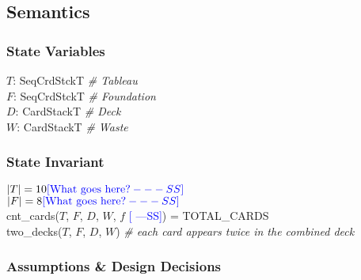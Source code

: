 \documentclass[12pt]{article}
\newcommand{\authornote}[3]{\textcolor{#1}{[#3 ---#2]}}
\newcommand{\authornote}[3]{}
\newcommand{\wss}[1]{\authornote{blue}{SS}{#1}}
\begin{document}
\subsection* {Semantics}

\subsubsection* {State Variables}

$T$: SeqCrdStckT \textit{\# Tableau}\\
$F$: SeqCrdStckT \textit{\# Foundation}\\
$D$: CardStackT \textit{\# Deck}\\
$W$: CardStackT \textit{\# Waste}\\

\subsubsection* {State Invariant}

$|T| = 10 \wss{\text{What goes here?}}$\\
$|F| = 8 \wss{\text{What goes here?}}$\\
cnt\_cards($T$, $F$, $D$, $W$, $f$ \wss{}) = TOTAL\_CARDS\\
two\_decks($T$, $F$, $D$, $W$) \textit{\# each card appears twice in the combined deck}

\subsubsection* {Assumptions \& Design Decisions}
\end{document}
